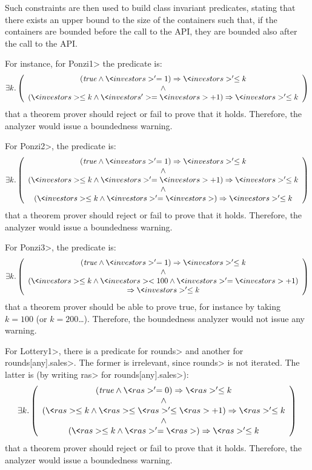 Such constraints are then used to build class invariant predicates,
stating that there exists an upper bound to the size of the containers
such that, if the containers are bounded before the call to the API,
they are bounded also after the call to the API.

For instance, for \<Ponzi1> the predicate is:
%
\[
  \exists k.\left(\begin{array}{c}
    (\mathit{true}\wedge\<investors>'=1)\Rightarrow\<investors>'\le k\\
    \wedge\\
    (\<investors>\le k\wedge\<investors'>=\<investors>+1)\Rightarrow\<investors>'\le k
  \end{array}\right)
\]
%
that a theorem prover should reject or fail to prove that it holds. Therefore,
the analyzer would issue a boundedness warning.

For \<Ponzi2>, the predicate is:
%
\[
  \exists k.\left(\begin{array}{c}
    (\mathit{true}\wedge\<investors>'=1)\Rightarrow\<investors>'\le k\\
    \wedge\\
    (\<investors>\le k\wedge\<investors>'=\<investors>+1)\Rightarrow\<investors>'\le k\\
    \wedge\\
    (\<investors>\le k\wedge\<investors>'=\<investors>)\Rightarrow\<investors>'\le k\\
  \end{array}\right)
\]
%
that a theorem prover should reject or fail to prove that it holds. Therefore,
the analyzer would issue a boundedness warning.

For \<Ponzi3>, the predicate is:
%
\[
  \exists k.\left(\begin{array}{c}
    (\mathit{true}\wedge\<investors>'=1)\Rightarrow\<investors>'\le k\\
    \wedge\\
    (\<investors>\le k\wedge\<investors><100\wedge\<investors>'=\<investors>+1)\\
    \Rightarrow\<investors>'\le k
  \end{array}\right)
\]
%
that a theorem prover should be able to prove true, for instance by taking
$k=100$ (or $k=200$\ldots). Therefore, the boundedness analyzer would not issue
any warning.

For \<Lottery1>, there is a predicate for \<rounds> and another for
\<rounds[any].sales>. The former is irrelevant, since \<rounds> is not
iterated. The latter is (by writing \<ras> for \<rounds[any].sales>):
%
\[
  \exists k.\left(\begin{array}{c}
    (\mathit{true}\wedge\<ras>'=0)\Rightarrow\<ras>'\le k\\
    \wedge\\
    (\<ras>\le k\wedge\<ras>\le\<ras>'\le\<ras>+1)\Rightarrow\<ras>'\le k\\
    \wedge\\
    (\<ras>\le k\wedge\<ras>'=\<ras>)\Rightarrow\<ras>'\le k
  \end{array}\right)
\]
%
that a theorem prover should reject or fail to prove that it holds. Therefore,
the analyzer would issue a boundedness warning.

